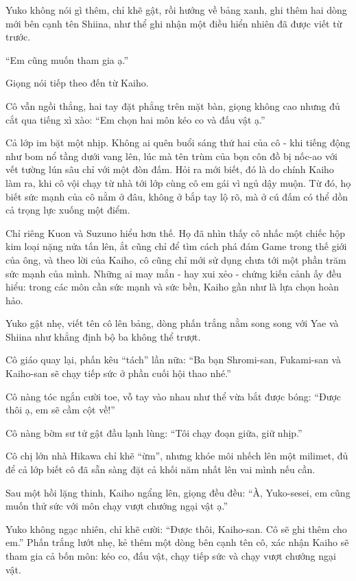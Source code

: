 \documentclass[../main.tex]{subfiles}
\begin{document}
Yuko không nói gì thêm, chỉ khẽ gật, rồi hướng về bảng xanh, ghi thêm hai dòng mới bên cạnh tên Shiina, như thể ghi nhận một điều hiển nhiên đã được viết từ trước.

``Em cũng muốn tham gia ạ.''

Giọng nói tiếp theo đến từ Kaiho.

Cô vẫn ngồi thẳng, hai tay đặt phẳng trên mặt bàn, giọng không cao nhưng đủ cắt qua tiếng xì xào: ``Em chọn hai môn kéo co và đấu vật ạ.''

Cả lớp im bặt một nhịp. Không ai quên buổi sáng thứ hai của cô - khi tiếng động như bom nổ tầng dưới vang lên, lúc mà tên trùm của bọn côn đồ bị nốc-ao với vết tường lún sâu chỉ với một đòn đấm. Hỏi ra mới biết, đó là do chính Kaiho làm ra, khi cô vội chạy từ nhà tới lớp cùng cô em gái vì ngủ dậy muộn. Từ đó, họ biết sức mạnh của cô nằm ở đâu, không ở bắp tay lộ rõ, mà ở cú đấm có thể dồn cả trọng lực xuống một điểm.

Chỉ riêng Kuon và Suzuno hiểu hơn thế. Họ đã nhìn thấy cô nhấc một chiếc hộp kim loại nặng nửa tấn lên, ắt cũng chỉ để tìm cách phá đám Game trong thế giới của ông, và theo lời của Kaiho, cô cũng chỉ mới sử dụng chưa tới một phần trăm sức mạnh của mình. Những ai may mắn - hay xui xẻo - chứng kiến cảnh ấy đều hiểu: trong các môn cần sức mạnh và sức bền, Kaiho gần như là lựa chọn hoàn hảo.

Yuko gật nhẹ, viết tên cô lên bảng, dòng phấn trắng nằm song song với Yae và Shiina như khẳng định bộ ba không thể trượt.

Cô giáo quay lại, phấn kêu ``tách'' lần nữa: ``Ba bạn Shromi-san, Fukami-san và Kaiho-san sẽ chạy tiếp sức ở phần cuối hội thao nhé.''

Cô nàng tóc ngắn cười toe, vỗ tay vào nhau như thể vừa bắt được bóng: ``Được thôi ạ, em sẽ cầm cột về!''

Cô nàng bờm sư tử gật đầu lạnh lùng: ``Tôi chạy đoạn giữa, giữ nhịp.''

Cô chị lớn nhà Hikawa chỉ khẽ ``ừm'', nhưng khóe môi nhếch lên một milimet, đủ để cả lớp biết cô đã sẵn sàng đặt cả khối năm nhất lên vai mình nếu cần.

Sau một hồi lặng thinh, Kaiho ngẩng lên, giọng đều đều: ``À, Yuko-sesei, em cũng muốn thử sức với môn chạy vượt chướng ngại vật ạ.''

Yuko không ngạc nhiên, chỉ khẽ cười: ``Được thôi, Kaiho-san. Cô sẽ ghi thêm cho em.'' Phấn trắng lướt nhẹ, kẻ thêm một dòng bên cạnh tên cô, xác nhận Kaiho sẽ tham gia cả bốn môn: kéo co, đấu vật, chạy tiếp sức và chạy vượt chướng ngại vật.
\end{document}
